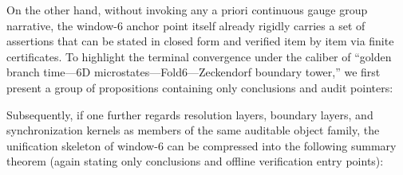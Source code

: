 On the other hand, without invoking any a priori continuous gauge group narrative, the window-\(6\) anchor point itself already rigidly carries a set of assertions that can be stated in closed form and verified item by item via finite certificates.
To highlight the terminal convergence under the caliber of ``golden branch time---6D microstates---Fold6---Zeckendorf boundary tower,'' we first present a group of propositions containing only conclusions and audit pointers:



Subsequently, if one further regards resolution layers, boundary layers, and synchronization kernels as members of the same auditable object family, the unification skeleton of window-\(6\) can be compressed into the following summary theorem (again stating only conclusions and offline verification entry points):

